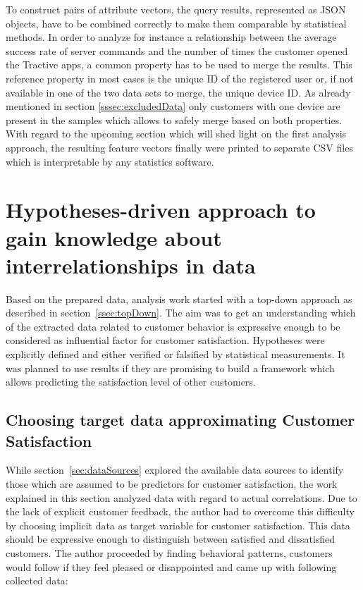 To construct pairs of attribute vectors, the query results, represented as JSON objects, have to be combined correctly to make them comparable by statistical methods. In order to analyze for instance a relationship between the average success rate of server commands and the number of times the customer opened the Tractive apps, a common property has to be used to merge the results. This reference property in most cases is the unique ID of the registered user or, if not available in one of the two data sets to merge, the unique device ID. As already mentioned in section \ref{sssec:excludedData} only customers with one device are present in the samples which allows to safely merge based on both properties. With regard to the upcoming section which will shed light on the first analysis approach, the resulting feature vectors finally were printed to separate CSV files which is interpretable by any statistics software.

\section{Hypotheses-driven approach to gain knowledge about interrelationships in data}
\label{sec:hypothesesDriven}
Based on the prepared data, analysis work started with a top-down approach as described in section~\ref{ssec:topDown}. The aim was to get an understanding which of the extracted data related to customer behavior is expressive enough to be considered as influential factor for customer satisfaction. Hypotheses were explicitly defined and either verified or falsified by statistical measurements. It was planned to use results if they are promising to build a framework which allows predicting the satisfaction level of other customers. 

\subsection{Choosing target data approximating Customer Satisfaction}
While section~\ref{sec:dataSources} explored the available data sources to identify those which are assumed to be predictors for customer satisfaction, the work explained in this section analyzed data with regard to actual correlations. Due to the lack of explicit customer feedback, the author had to overcome this difficulty by choosing implicit data as target variable for customer satisfaction. This data should be expressive enough to distinguish between satisfied and dissatisfied customers. The author proceeded by finding behavioral patterns, customers would follow if they feel pleased or disappointed and came up with following collected data:

